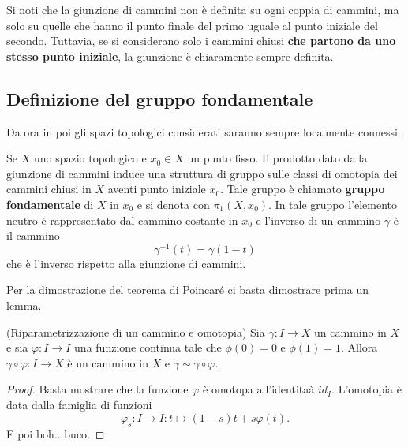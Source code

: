 \documentclass[]{article}
\begin{document}
    \begin{remark} \nl
        Si noti che la giunzione di cammini non è definita su ogni coppia di cammini, ma solo su quelle che hanno
        il punto finale del primo uguale al punto iniziale del secondo. Tuttavia, se si considerano solo i cammini chiusi \textbf{che partono da uno stesso punto iniziale},
        la giunzione è chiaramente sempre definita.
    \end{remark}

\subsection{Definizione del gruppo fondamentale}
    Da ora in poi gli spazi topologici considerati saranno sempre localmente connessi.

    \begin{theorem} [Poincar\'e] \nl
        Se $X$ uno spazio topologico e $x_0 \in X$ un punto fisso. \nl
        Il prodotto dato dalla giunzione di cammini induce una struttura di gruppo sulle classi di omotopia
        dei cammini chiusi in $X$ aventi punto iniziale $x_0$. \nl
        Tale gruppo è chiamato \textbf{gruppo fondamentale} di $X$ in $x_0$ e si denota con $\pi_1(X,x_0)$. \nl
        In tale gruppo l'elemento neutro è rappresentato dal cammino costante in $x_0$ e l'inverso di un cammino $\gamma$ è il cammino
        \[
            \gamma^{-1}(t) = \gamma(1-t)
        \]
        che è l'inverso rispetto alla giunzione di cammini.
    \end{theorem}

    Per la dimostrazione del teorema di Poincar\'e ci basta dimostrare prima un lemma.

    \begin{lemma} (Riparametrizzazione di un cammino e omotopia) \nl
        Sia $\gamma: I \to X$ un cammino in $X$ e sia $\varphi: I \to I$ una funzione continua tale che $\phi(0) = 0$ e $\phi(1) = 1$.
        Allora $\gamma \circ \varphi: I \to X$ è un cammino in $X$ e $\gamma \sim \gamma \circ \varphi$.
    \end{lemma}

    \begin{proof}
        Basta mostrare che la funzione $\varphi$ \`e omotopa all'identita\`a $id_I$. \nl
        L'omotopia \`e data dalla famiglia di funzioni
        \[
            \varphi_s: I \to I: t \mapsto (1-s) t + s \varphi(t).
        \]
        E poi boh.. buco.
    \end{proof}
\end{document}
